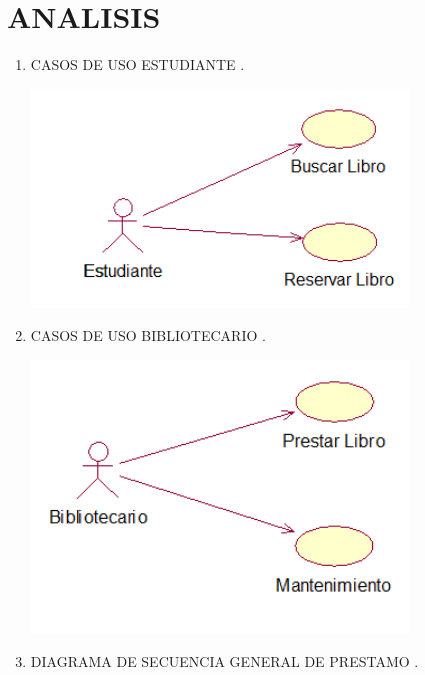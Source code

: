 \section{ANALISIS} 

\begin{enumerate}[1.]
	\item CASOS DE USO ESTUDIANTE .\\
	
    


	\begin{center}
	
	\includegraphics[width=10cm]{./Imagenes/img1} 
	\end{center}
	\item CASOS DE USO BIBLIOTECARIO .\\
	\begin{center}
	\includegraphics[width=10cm]{./Imagenes/img2} 
	\end{center}
\newpage
   	 \item DIAGRAMA DE SECUENCIA GENERAL DE PRESTAMO .\\
	\begin{center}

\end{center}
\end{enumerate}
